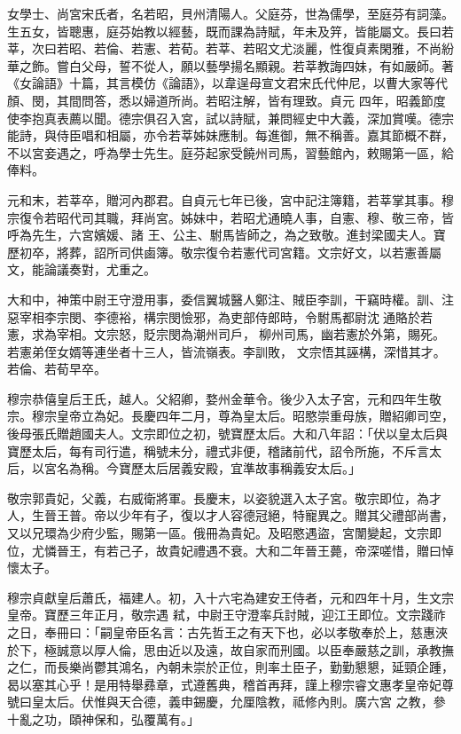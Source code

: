\begin{pinyinscope}
 女學士、尚宮宋氏者，名若昭，貝州清陽人。父庭芬，世為儒學，至庭芬有詞藻。生五女，皆聰惠，庭芬始教以經藝，既而課為詩賦，年未及笄，皆能屬文。長曰若莘，次曰若昭、若倫、若憲、若荀。若莘、若昭文尤淡麗，性復貞素閑雅，不尚紛華之飾。嘗白父母，誓不從人，願以藝學揚名顯親。若莘教誨四妹，有如嚴師。著《女論語》十篇，其言模仿《論語》，以韋逞母宣文君宋氏代仲尼，以曹大家等代顏、閔，其間問答，悉以婦道所尚。若昭注解，皆有理致。貞元
 四年，昭義節度使李抱真表薦以聞。德宗俱召入宮，試以詩賦，兼問經史中大義，深加賞嘆。德宗能詩，與侍臣唱和相屬，亦令若莘姊妹應制。每進御，無不稱善。嘉其節概不群，不以宮妾遇之，呼為學士先生。庭芬起家受饒州司馬，習藝館內，敕賜第一區，給俸料。



 元和末，若莘卒，贈河內郡君。自貞元七年已後，宮中記注簿籍，若莘掌其事。穆宗復令若昭代司其職，拜尚宮。姊妹中，若昭尤通曉人事，自憲、穆、敬三帝，皆呼為先生，六宮嬪媛、諸
 王、公主、駙馬皆師之，為之致敬。進封梁國夫人。寶歷初卒，將葬，詔所司供鹵簿。敬宗復令若憲代司宮籍。文宗好文，以若憲善屬文，能論議奏對，尤重之。



 大和中，神策中尉王守澄用事，委信翼城醫人鄭注、賊臣李訓，干竊時權。訓、注惡宰相李宗閔、李德裕，構宗閔憸邪，為吏部侍郎時，令駙馬都尉沈通賂於若憲，求為宰相。文宗怒，貶宗閔為潮州司戶，柳州司馬，幽若憲於外第，賜死。若憲弟侄女婿等連坐者十三人，皆流嶺表。李訓敗，
 文宗悟其誣構，深惜其才。若倫、若荀早卒。



 穆宗恭僖皇后王氏，越人。父紹卿，婺州金華令。後少入太子宮，元和四年生敬宗。穆宗皇帝立為妃。長慶四年二月，尊為皇太后。昭愍崇重母族，贈紹卿司空，後母張氏贈趙國夫人。文宗即位之初，號寶歷太后。大和八年詔：「伏以皇太后與寶歷太后，每有司行遣，稱號未分，禮式非便，稽諸前代，詔令所施，不斥言太后，以宮名為稱。今寶歷太后居義安殿，宜準故事稱義安太后。」



 敬宗郭貴妃，父義，右威衛將軍。長慶末，以姿貌選入太子宮。敬宗即位，為才人，生晉王普。帝以少年有子，復以才人容德冠絕，特寵異之。贈其父禮部尚書，又以兄環為少府少監，賜第一區。俄冊為貴妃。及昭愍遇盜，宮闈變起，文宗即位，尤憐晉王，有若己子，故貴妃禮遇不衰。大和二年晉王薨，帝深嗟惜，贈曰悼懷太子。



 穆宗貞獻皇后蕭氏，福建人。初，入十六宅為建安王侍者，元和四年十月，生文宗皇帝。寶歷三年正月，敬宗遇
 弒，中尉王守澄率兵討賊，迎江王即位。文宗踐祚之日，奉冊曰：「嗣皇帝臣名言：古先哲王之有天下也，必以孝敬奉於上，慈惠浹於下，極誠意以厚人倫，思由近以及遠，故自家而刑國。以臣奉嚴慈之訓，承教撫之仁，而長樂尚鬱其鴻名，內朝未崇於正位，則率土臣子，勤勤懇懇，延頸企踵，曷以塞其心乎！是用特舉彞章，式遵舊典，稽首再拜，謹上穆宗睿文惠孝皇帝妃尊號曰皇太后。伏惟與天合德，義申錫慶，允厘陰教，祗修內則。廣六宮
 之教，參十亂之功，頤神保和，弘覆萬有。」




\end{pinyinscope}
